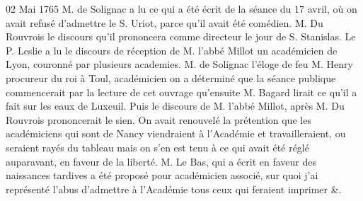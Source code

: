 \begin{diary}{02 Mai 1765}{}
                           M. de Solignac a lu ce qui a été
                           écrit
                           de la séance du 17 avril, où on
                           avait
                           refusé d'admettre le S. Uriot,
                           parce qu'il
                           avait été comédien. M. Du
                              Rouvrois le
                           discours qu'il prononcera comme directeur
                           le jour de S. Stanislas. Le P.
                              Leslie a lu
                           le discours de réception de M. l'abbé Millot
                           un académicien de Lyon,
                           couronné par plusieurs
                           academies. M. de Solignac
                           l'éloge de feu
                           M. Henry
                           procureur du roi à Toul,
                           académicien
                           on a déterminé que la séance publique
                           commencerait par la lecture de cet ouvrage qu'ensuite M.
                              Bagard lirait ce qu'il a fait
                           sur les eaux de Luxeuil. Puis le discours
                              de M. l'abbé
                                 Millot, après M. Du
                              Rouvrois
                           prononcerait le sien. On
                           avait renouvelé
                           la prétention que les académiciens qui sont
                           de Nancy viendraient à
                              l'Académie et
                           travailleraient, ou seraient rayés du tableau
                           mais on s'en est tenu à ce qui avait été
                           réglé auparavant, en faveur de la liberté.
                           M. Le Bas, qui a écrit en faveur
                           des
                           naissances tardives a été proposé pour
                           académicien associé, sur quoi j'ai représenté
                           l'abus d'admettre à l'Académie
                           tous ceux qui
                           feraient imprimer &. \bigskip
        
        
                     \end{diary}

